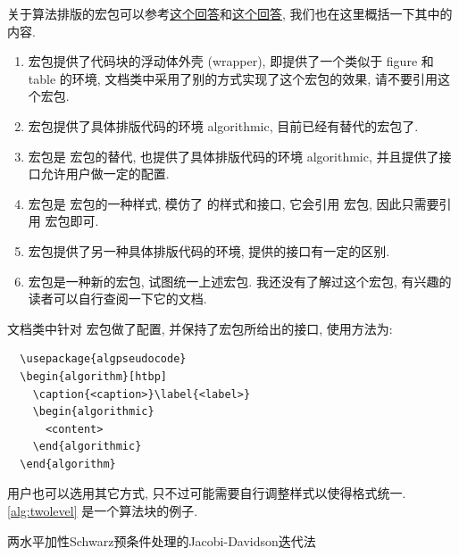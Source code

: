 关于算法排版的宏包可以参考\href{https://tex.stackexchange.com/a/230789/}{这个回答}和\href{https://tex.stackexchange.com/a/594570/}{这个回答}, 我们也在这里概括一下其中的内容.
\begin{enumerate}
  \item {} 宏包提供了代码块的浮动体外壳 (wrapper), 即提供了一个类似于 figure 和 table 的环境, 文档类中采用了别的方式实现了这个宏包的效果, 请不要引用这个宏包.
  \item {} 宏包提供了具体排版代码的环境 algorithmic, 目前已经有替代的宏包了.
  \item {} 宏包是  宏包的替代, 也提供了具体排版代码的环境 algorithmic, 并且提供了接口允许用户做一定的配置.
  \item {} 宏包是  宏包的一种样式, 模仿了  的样式和接口, 它会引用  宏包, 因此只需要引用  宏包即可.
  \item {} 宏包提供了另一种具体排版代码的环境, 提供的接口有一定的区别.
  \item {} 宏包是一种新的宏包, 试图统一上述宏包. 我还没有了解过这个宏包, 有兴趣的读者可以自行查阅一下它的文档.
\end{enumerate}

文档类中针对  宏包做了配置, 并保持了宏包所给出的接口, 使用方法为:
\begin{verbatim}
  \usepackage{algpseudocode}
  \begin{algorithm}[htbp]
    \caption{<caption>}\label{<label>}
    \begin{algorithmic}
      <content>
    \end{algorithmic}
  \end{algorithm}
\end{verbatim}
用户也可以选用其它方式, 只不过可能需要自行调整样式以使得格式统一. \ref{alg:twolevel} 是一个算法块的例子.

\begin{algorithm}[htbp]
	\caption{两水平加性Schwarz预条件处理的Jacobi-Davidson迭代法}\label{alg:twolevel}
	\begin{algorithmic}
	  \EndWhile
	\end{algorithmic}
\end{algorithm}

\zhlipsum[1]
